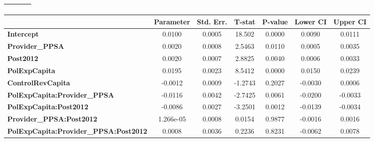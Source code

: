 \begin{center}
\begin{tabular}{lclc}
\textbf{}                                     &                    & \textbf{                     }   &                  \\
\bottomrule
\end{tabular}
\begin{tabular}{lcccccc}
                                              & \textbf{Parameter} & \textbf{Std. Err.} & \textbf{T-stat} & \textbf{P-value} & \textbf{Lower CI} & \textbf{Upper CI}  \\
\midrule
\textbf{Intercept}                            &       0.0100       &       0.0005       &      18.502     &      0.0000      &       0.0090      &       0.0111       \\
\textbf{Provider\_PPSA}                       &       0.0020       &       0.0008       &      2.5463     &      0.0110      &       0.0005      &       0.0035       \\
\textbf{Post2012}                             &       0.0020       &       0.0007       &      2.8825     &      0.0040      &       0.0006      &       0.0033       \\
\textbf{PolExpCapita}                         &       0.0195       &       0.0023       &      8.5412     &      0.0000      &       0.0150      &       0.0239       \\
\textbf{ControlRevCapita}                     &      -0.0012       &       0.0009       &     -1.2743     &      0.2027      &      -0.0030      &       0.0006       \\
\textbf{PolExpCapita:Provider\_PPSA}          &      -0.0116       &       0.0042       &     -2.7425     &      0.0061      &      -0.0200      &      -0.0033       \\
\textbf{PolExpCapita:Post2012}                &      -0.0086       &       0.0027       &     -3.2501     &      0.0012      &      -0.0139      &      -0.0034       \\
\textbf{Provider\_PPSA:Post2012}              &     1.266e-05      &       0.0008       &      0.0154     &      0.9877      &      -0.0016      &       0.0016       \\
\textbf{PolExpCapita:Provider\_PPSA:Post2012} &       0.0008       &       0.0036       &      0.2236     &      0.8231      &      -0.0062      &       0.0078       \\
\bottomrule
\end{tabular}
\end{center}